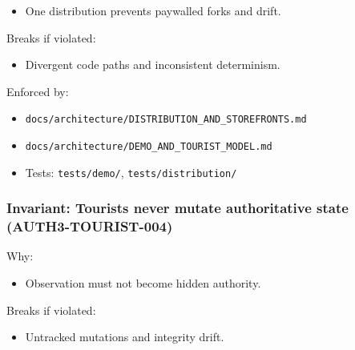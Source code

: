 \documentclass[9pt,a4paper,openany]{book}
\begin{document}
\begin{itemize}
\item One distribution prevents paywalled forks and drift.\allowbreak{}
\end{itemize}


Breaks if violated:



\begin{itemize}
\item Divergent code paths and inconsistent determinism.\allowbreak{}
\end{itemize}


Enforced by:



\begin{itemize}
\item \texttt{docs/\allowbreak{}architecture/\allowbreak{}DISTRIBUTION\_\allowbreak{}AND\_\allowbreak{}STOREFRONTS.\allowbreak{}md}
\end{itemize}


\begin{itemize}
\item \texttt{docs/\allowbreak{}architecture/\allowbreak{}DEMO\_\allowbreak{}AND\_\allowbreak{}TOURIST\_\allowbreak{}MODEL.\allowbreak{}md}
\end{itemize}


\begin{itemize}
\item Tests: \texttt{tests/\allowbreak{}demo/\allowbreak{}}, \texttt{tests/\allowbreak{}distribution/\allowbreak{}}
\end{itemize}





\subsubsection{Invariant: Tourists never mutate authoritative state (AUTH3-TOURIST-004)}


Why:



\begin{itemize}
\item Observation must not become hidden authority.\allowbreak{}
\end{itemize}


Breaks if violated:



\begin{itemize}
\item Untracked mutations and integrity drift.\allowbreak{}
\end{itemize}
\end{document}
